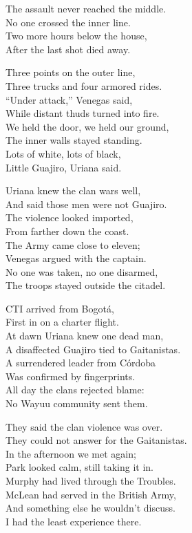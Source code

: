 \begin{lyrics}
The assault never reached the middle.\\
No one crossed the inner line.\\
Two more hours below the house,\\
After the last shot died away.

Three points on the outer line,\\
Three trucks and four armored rides.\\
“Under attack,” Venegas said,\\
While distant thuds turned into fire.\\
We held the door, we held our ground,\\
The inner walls stayed standing.\\
Lots of white, lots of black,\\
Little Guajiro, Uriana said.

Uriana knew the clan wars well,\\
And said those men were not Guajiro.\\
The violence looked imported,\\
From farther down the coast.\\
The Army came close to eleven;\\
Venegas argued with the captain.\\
No one was taken, no one disarmed,\\
The troops stayed outside the citadel.

CTI arrived from Bogotá,\\
First in on a charter flight.\\
At dawn Uriana knew one dead man,\\
A disaffected Guajiro tied to Gaitanistas.\\
A surrendered leader from Córdoba\\
Was confirmed by fingerprints.\\
All day the clans rejected blame:\\
No Wayuu community sent them.

They said the clan violence was over.\\
They could not answer for the Gaitanistas.\\
In the afternoon we met again;\\
Park looked calm, still taking it in.\\
Murphy had lived through the Troubles.\\
McLean had served in the British Army,\\
And something else he wouldn’t discuss.\\
I had the least experience there.


\end{lyrics}
